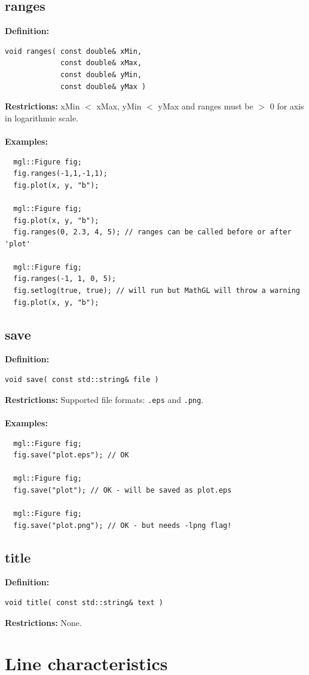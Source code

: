 \documentclass[a4paper]{article}
\newcommand{\command}[1]{\subsection{#1}}
\begin{document}
\command{ranges}

\textbf{Definition:}
\begin{lstlisting}
void ranges( const double& xMin, 
             const double& xMax, 
             const double& yMin, 
             const double& yMax )
\end{lstlisting}
%
\textbf{Restrictions:} xMin $<$ xMax, yMin $<$ yMax and ranges must be $>$ 0 for axis in logarithmic scale. \\ \\
%
\textbf{Examples:}
\begin{lstlisting}
  mgl::Figure fig;
  fig.ranges(-1,1,-1,1);
  fig.plot(x, y, "b");

  mgl::Figure fig;
  fig.plot(x, y, "b");
  fig.ranges(0, 2.3, 4, 5); // ranges can be called before or after 'plot'

  mgl::Figure fig;
  fig.ranges(-1, 1, 0, 5);
  fig.setlog(true, true); // will run but MathGL will throw a warning 
  fig.plot(x, y, "b");
\end{lstlisting}

\newpage
\command{save}

\textbf{Definition:}
\begin{lstlisting}
void save( const std::string& file )
\end{lstlisting}
%
\textbf{Restrictions:} Supported file formats: \texttt{.eps} and \texttt{.png}. \\ \\
%
\textbf{Examples:}
\begin{lstlisting}
  mgl::Figure fig;
  fig.save("plot.eps"); // OK

  mgl::Figure fig;
  fig.save("plot"); // OK - will be saved as plot.eps

  mgl::Figure fig;
  fig.save("plot.png"); // OK - but needs -lpng flag!
\end{lstlisting}

\command{title}

\textbf{Definition:}
\begin{lstlisting}
void title( const std::string& text )
\end{lstlisting}
%
\textbf{Restrictions:} None.

\section{Line characteristics}
\end{document}
